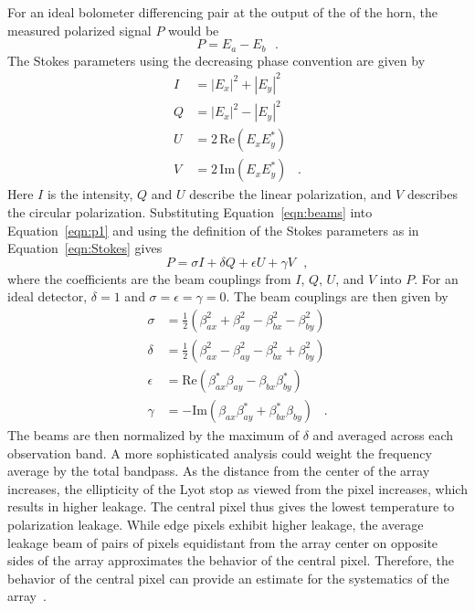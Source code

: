 For an ideal bolometer differencing pair at the output of the of the horn, the measured polarized signal $P$ would be
\begin{equation}\label{eqn:p1}
P=E_a-E_b \,\,\,\,.
\end{equation}
The Stokes parameters using the decreasing phase convention are given by
\begin{align}\label{eqn:Stokes}
I & =  |E_{x}|^2+ |E_{y}|^2  \nonumber \\
Q & =   |E_{x}|^2- |E_{y}|^2  \nonumber \\
U & =  2\,\mathrm{Re}(E_{x} E_{y}^{*}) \nonumber \\
V & =  2\,\mathrm{Im}(E_{x} E_{y}^{*})\,\,\,\,\,.
\end{align}
Here $I$ is the intensity, $Q$ and $U$ describe the linear polarization, and $V$ describes the circular polarization. Substituting Equation~\ref{eqn:beams} into Equation~\ref{eqn:p1} and using the definition of the Stokes parameters  as in Equation~\ref{eqn:Stokes} gives
\begin{equation}
P=\sigma I + \delta Q + \epsilon U+ \gamma V\,\,\,\, ,
\end{equation}
where the coefficients are the beam couplings from $I$, $Q$, $U$, and $V$ into $P$. For an ideal detector, $\delta=1$ and $\sigma=\epsilon=\gamma=0$. The beam couplings are then given by
\begin{align}\label{eqn:leakage beams}
\sigma & =  \frac{1}{2} (\beta_{ax}^2 + \beta_{ay}^2 - \beta_{bx}^2 - \beta_{by}^2) \\
\delta & =   \frac{1}{2} (\beta_{ax}^2 - \beta_{ay}^2 - \beta_{bx}^2 + \beta_{by}^2) \\
\epsilon & =  \mathrm{Re}(\beta_{ax}^{*} \beta_{ay} - \beta_{bx}\beta_{by}^{*} )  \\
\gamma & =  -\mathrm{Im}(\beta_{ax} \beta_{ay}^{*} + \beta_{bx}^{*}\beta_{by} )\,\,\,\,\,.
\end{align}
The beams are then normalized by the maximum of $\delta$ and averaged across each observation band. A more sophisticated analysis could weight the frequency average by the total bandpass. As the distance from the center of the array increases, the ellipticity of the Lyot stop as viewed from the pixel increases, which results in higher leakage. The central pixel thus gives the lowest temperature to polarization leakage. While edge pixels exhibit higher leakage, the average leakage beam of pairs of pixels equidistant from the array center on opposite sides of the array approximates the behavior of the central pixel. Therefore, the behavior of the central pixel can provide an estimate for the systematics of the array~\cite{Simon_Thesis_2016}.

